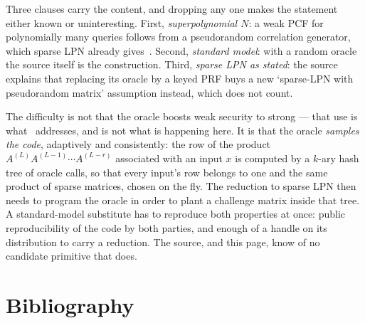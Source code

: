 \documentclass{conjura-conjecture}
\begin{document}
\begin{remark}
Three clauses carry the content, and dropping any one makes the
statement either known or uninteresting. First,
\emph{superpolynomial $N$}: a
weak PCF for polynomially many queries follows from a pseudorandom
correlation generator, which sparse LPN already gives~\cite{BCGI18}.
Second, \emph{standard model}: with a random oracle the source itself
is the construction. Third,
\emph{sparse LPN as stated}: the source explains that
replacing its oracle by a keyed PRF buys a new `sparse-LPN with
pseudorandom matrix' assumption instead, which does not count.
\end{remark}

\begin{remark}
The difficulty is not that the oracle boosts weak security to strong ---
that use is what~\cite{BCEKM24} addresses, and is not what is happening
here. It is that the oracle \emph{samples the code}, adaptively and
consistently: the row of the product
$A^{(L)} A^{(L-1)} \cdots A^{(L-r)}$ associated with an input $x$ is
computed by a $k$-ary hash tree of oracle calls, so that every input's
row belongs to one and the same product of sparse matrices, chosen on
the fly. The reduction to sparse LPN then needs to program the oracle in
order to plant a challenge matrix inside that tree. A standard-model
substitute has to reproduce both properties at once: public
reproducibility of the code by both parties, and enough of a handle on
its distribution to carry a reduction. The source, and this page, know
of no candidate primitive that does.
\end{remark}

\section{Bibliography}
\end{document}
